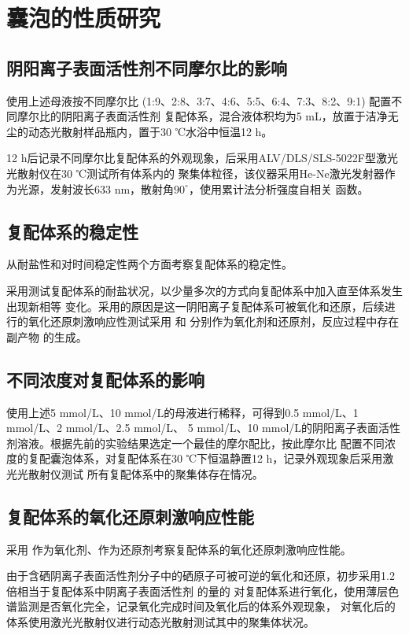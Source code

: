 \documentclass[bachelor,winfonts,replaceperiod]{jnuthesis}
\begin{document}
    \section{囊泡的性质研究}
    \subsection{阴阳离子表面活性剂不同摩尔比的影响}
    使用上述母液按不同摩尔比 (1:9、2:8、3:7、4:6、5:5、6:4、7:3、8:2、9:1) 配置不同摩尔比的阴阳离子表面活性剂
    复配体系，混合液体积均为5 mL，放置于洁净无尘的动态光散射样品瓶内，置于30 ℃水浴中恒温12 h。
    
    12 h后记录不同摩尔比复配体系的外观现象，后采用ALV/DLS/SLS-5022F型激光光散射仪在30 ℃测试所有体系内的
    聚集体粒径，该仪器采用He-Ne激光发射器作为光源，发射波长633 nm，散射角$90^\circ$，使用累计法分析强度自相关
    函数。
    
    \subsection{复配体系的稳定性}
    从耐盐性和对时间稳定性两个方面考察复配体系的稳定性。
    
    采用测试复配体系的耐盐状况，以少量多次的方式向复配体系中加入直至体系发生出现新相等
    变化。采用的原因是这一阴阳离子复配体系可被氧化和还原，后续进行的氧化还原刺激响应性测试采用
    和  分别作为氧化剂和还原剂，反应过程中存在副产物  的生成。
    
    \subsection{不同浓度对复配体系的影响}
    使用上述5 mmol/L、10 mmol/L的母液进行稀释，可得到0.5 mmol/L、1 mmol/L、2 mmol/L、2.5 mmol/L、
    5 mmol/L、10 mmol/L的阴阳离子表面活性剂溶液。根据先前的实验结果选定一个最佳的摩尔配比，按此摩尔比
    配置不同浓度的复配囊泡体系，对复配体系在30 ℃下恒温静置12 h，记录外观现象后采用激光光散射仪测试
    所有复配体系中的聚集体存在情况。
    
    \subsection{复配体系的氧化还原刺激响应性能}
    采用 作为氧化剂、作为还原剂考察复配体系的氧化还原刺激响应性能。
    
    由于含硒阴离子表面活性剂分子中的硒原子可被可逆的氧化和还原，初步采用1.2倍相当于复配体系中阴离子表面活性剂
    的量的  对复配体系进行氧化，使用薄层色谱监测是否氧化完全，记录氧化完成时间及氧化后的体系外观现象，
    对氧化后的体系使用激光光散射仪进行动态光散射测试其中的聚集体状况。
    
\end{document}
